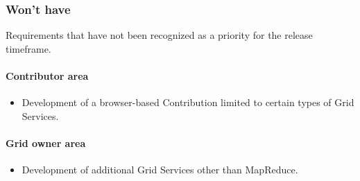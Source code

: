 \subsubsection{Won't have}
Requirements that have not been recognized as a priority for the release timeframe.
\paragraph{Contributor area}
\begin{itemize}
    \item Development of a browser-based Contribution limited to certain types of Grid Services.
\end{itemize}
\paragraph{Grid owner area}
\begin{itemize}
    \item Development of additional Grid Services other than MapReduce.
\end{itemize}